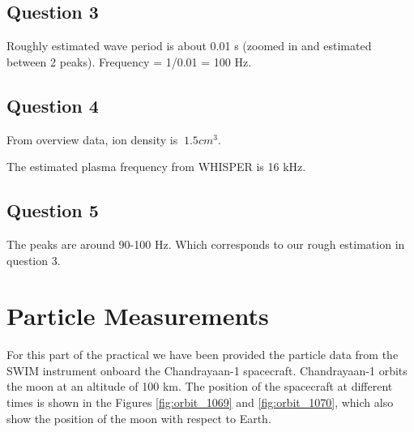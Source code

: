 \documentclass{article}
\begin{document}
\subsection{Question 3}
Roughly estimated wave period is about 0.01 s (zoomed in and estimated between 2 peaks). Frequency = 1/0.01 = 100 Hz.

\subsection{Question 4}
From overview data, ion density is $~1.5 cm^3$. 

The estimated plasma frequency from WHISPER is 16 kHz.

\subsection{Question 5}
The peaks are around 90-100 Hz. Which corresponds to our rough estimation in question 3.

\clearpage
\section{Particle Measurements}

For this part of the practical we have been provided the particle data from the SWIM
instrument onboard the Chandrayaan-1 spacecraft. Chandrayaan-1 orbits the moon at an altitude of 100 km. The position of the spacecraft at different times is shown in the Figures \ref{fig:orbit_1069} and \ref{fig:orbit_1070}, which also show the position of the moon with respect to Earth.
\end{document}
